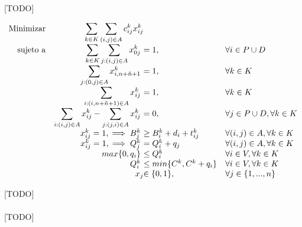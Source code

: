 \documentclass{subfiles}
\begin{document}
      \paragraph{}
      [TODO]
      \begin{eqfloat}
				\begin{equation}
					\begin{array}{rr@{}ll}
  					\text{Minimizar} & \displaystyle\sum\limits_{k \in K}\sum\limits_{(i, j) \in A}  c_{ij}^{k}x_{ij}^{k} &                 & \\
						\text{sujeto a}	 & \displaystyle\sum\limits_{k \in K}\sum\limits_{j: (i, j) \in A} x_{0j}^{k} \ &= 1,                      & \forall i \in P \cup D \\
                             & \displaystyle\sum\limits_{j: (0, j) \in A} x_{i,n+\tilde{n} + 1}^{k}  \ &= 1, 	                          & \forall k \in K \\
                             & \displaystyle\sum\limits_{i: (i, n + \tilde{n} + 1) \in A} x_{ij}^{k} \ &= 1, 	                          & \forall k \in K \\
                             & \displaystyle\sum\limits_{i: (i, j) \in A} x_{ij}^{k} - \sum\limits_{j: (j, i) \in A} x_{ij}^{k} \ &= 0, & \forall j \in P \cup D, \forall k \in K \\
                             & x_{ij}^{k} = 1, \implies B_{j}^{k} \ &\geq B_{i}^{k} + d_{i} + t_{ij}^{k} 	                          & \forall (i, j) \in A, \forall k \in K \\
                             & x_{ij}^{k} = 1, \implies Q_{j}^{k} \ &= Q_{i}^{k} + q_{j} 	                          & \forall (i, j) \in A, \forall k \in K \\
                             & max\{0, q_{i}\} \ &\leq Q_{i}^k 	                          & \forall i \in V, \forall k \in K \\
                             & Q_{i}^k \ &\leq min\{C^{k}, C^{k} + q_{i}\} 	                          & \forall i \in V, \forall k \in K \\
														 &                               	x_{j} 	&\in \{0,1\}, 	                 & \forall j \in \{1,...,n\} \\
					\end{array}
				\end{equation}
				\caption{[TODO]}
				\label{eq:basic_formulation}
			\end{eqfloat}

      \paragraph{}
      [TODO]
\end{document}
